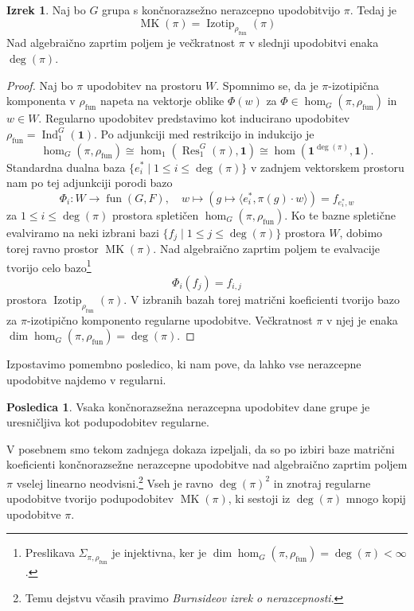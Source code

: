 \documentclass[11pt]{book}
\def\11{\mathbf{1}}
\DeclareMathOperator\Res{Res}
\DeclareMathOperator\Ind{Ind}
\DeclareMathOperator\Izotip{Izotip}
\DeclareMathOperator\MK{MK}
\DeclareMathOperator\fun{fun}
\theoremstyle{definition}
\theoremstyle{zgled}
\theoremstyle{odprtproblem}
\theoremstyle{domacanaloga}
\newenvironment{dokaz}
    {\color{siva}\begin{proof}}
    {\end{proof}}
\theoremstyle{izrek}
\newtheorem*{izrek}{Izrek}
\newtheorem*{posledica}{Posledica}
\begin{document}
\begin{izrek}
Naj bo $G$ grupa s končnorazsežno nerazcepno upodobitvijo $\pi$. Tedaj je
\[
   \textstyle  \MK(\pi) = \Izotip_{\rho_{\fun}}(\pi)
\]
Nad algebraično zaprtim poljem je večkratnost $\pi$ v slednji upodobitvi enaka $\deg(\pi)$.
\end{izrek}
\begin{dokaz}
Naj bo $\pi$ upodobitev na prostoru $W$. Spomnimo se, da je $\pi$-izotipična komponenta v $\rho_{\fun}$ napeta na vektorje oblike $\Phi(w)$ za $\Phi \in \hom_G(\pi, \rho_{\fun})$ in $w \in W$. Regularno upodobitev predstavimo kot inducirano upodobitev $\rho_{\fun} = \Ind^G_1(\11)$. Po adjunkciji med restrikcijo in indukcijo je
\[
    \textstyle \hom_G(\pi, \rho_{\fun}) \cong \hom_1(\Res^G_1(\pi), \11)
    \cong \hom(\11^{\deg(\pi)}, \11).
\]
Standardna dualna baza $\{ e_i^* \mid 1 \leq i \leq \deg(\pi) \}$ v zadnjem vektorskem prostoru nam po tej adjunkciji porodi bazo
\[
    \Phi_i \colon W \to \fun(G,F), \quad
    w \mapsto \left( g \mapsto \langle e_i^*, \pi(g) \cdot w \rangle \right) = f_{e_i^*, w}
\]
za $1 \leq i \leq \deg(\pi)$ prostora spletičen $\hom_G(\pi, \rho_{\fun})$. Ko te bazne spletične evalviramo na neki izbrani bazi $\{ f_j \mid 1 \leq j \leq \deg(\pi) \}$ prostora $W$, dobimo torej ravno prostor $\MK(\pi)$. Nad algebraično zaprtim poljem te evalvacije tvorijo celo bazo\footnote{Preslikava $\Sigma_{\pi, \rho_{\fun}}$ je injektivna, ker je $\dim \hom_G(\pi, \rho_{\fun}) = \deg(\pi) < \infty$.}
\[
    \Phi_i(f_j) = f_{i,j}
\]
prostora $\Izotip_{\rho_{\fun}}(\pi)$. V izbranih bazah torej matrični koeficienti tvorijo bazo za $\pi$-izotipično komponento regularne upodobitve. Večkratnost $\pi$ v njej je enaka $\dim \hom_G(\pi, \rho_{\fun}) = \deg(\pi)$.
\end{dokaz}

Izpostavimo pomembno posledico, ki nam pove, da lahko vse nerazcepne upodobitve najdemo v regularni.

\begin{posledica}
Vsaka končnorazsežna nerazcepna upodobitev dane grupe je uresničljiva kot podupodobitev regularne.
\end{posledica}

V posebnem smo tekom zadnjega dokaza izpeljali, da so po izbiri baze matrični koeficienti končnorazsežne nerazcepne upodobitve nad algebraično zaprtim poljem $\pi$ vselej linearno neodvisni.\footnote{Temu dejstvu včasih pravimo \emph{Burnsideov izrek o nerazcepnosti}.} Vseh je ravno $\deg(\pi)^2$ in znotraj regularne upodobitve tvorijo podupodobitev $\MK(\pi)$, ki sestoji iz $\deg(\pi)$ mnogo kopij upodobitve $\pi$.
\end{document}
